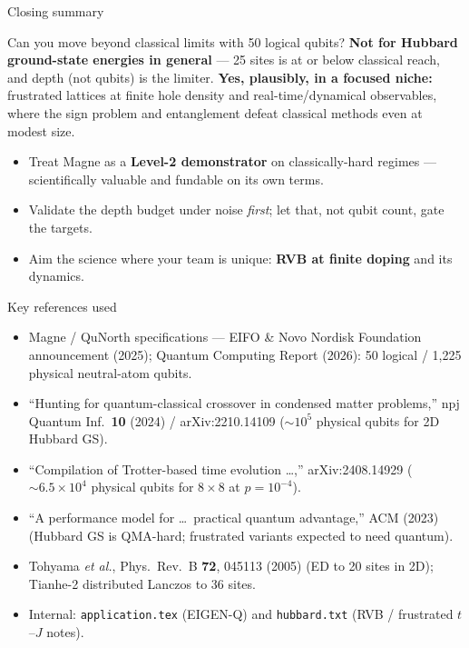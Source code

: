 \documentclass[aspectratio=169,11pt]{beamer}
\begin{document}
\begin{frame}{Closing summary}
\begin{block}{Can you move beyond classical limits with 50 logical qubits?}
\textbf{Not for Hubbard ground-state energies in general} --- 25 sites is at or below
classical reach, and depth (not qubits) is the limiter.
\textbf{Yes, plausibly, in a focused niche:} frustrated lattices at finite hole density
and real-time/dynamical observables, where the sign problem and entanglement defeat
classical methods even at modest size.
\end{block}
\begin{itemize}
  \item Treat Magne as a \textbf{Level-2 demonstrator} on classically-hard regimes ---
        scientifically valuable and fundable on its own terms.
  \item Validate the depth budget under noise \emph{first}; let that, not qubit count, gate the targets.
  \item Aim the science where your team is unique: \textbf{RVB at finite doping} and its dynamics.
\end{itemize}
\end{frame}

\begin{frame}{Key references used}
\scriptsize
\begin{itemize}
  \item Magne / QuNorth specifications --- EIFO \& Novo Nordisk Foundation announcement (2025);
        Quantum Computing Report (2026): 50 logical / 1{,}225 physical neutral-atom qubits.
  \item ``Hunting for quantum-classical crossover in condensed matter problems,''
        npj Quantum Inf.\ \textbf{10} (2024) / arXiv:2210.14109 ($\sim 10^{5}$ physical qubits for 2D Hubbard GS).
  \item ``Compilation of Trotter-based time evolution \dots,'' arXiv:2408.14929
        ($\sim 6.5\times10^{4}$ physical qubits for $8\times8$ at $p=10^{-4}$).
  \item ``A performance model for \dots\ practical quantum advantage,'' ACM (2023)
        (Hubbard GS is QMA-hard; frustrated variants expected to need quantum).
  \item Tohyama \emph{et al.}, Phys.\ Rev.\ B \textbf{72}, 045113 (2005) (ED to 20 sites in 2D);
        Tianhe-2 distributed Lanczos to 36 sites.
  \item Internal: \texttt{application.tex} (EIGEN-Q) and \texttt{hubbard.txt} (RVB / frustrated $t$--$J$ notes).
\end{itemize}
\end{frame}
\end{document}
